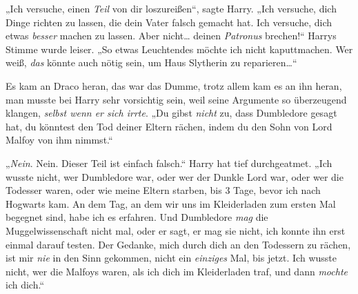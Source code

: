 „Ich versuche, einen \emph{Teil} von dir loszureißen“, sagte Harry. „Ich versuche, dich Dinge richten zu lassen, die dein Vater falsch gemacht hat. Ich versuche, dich etwas \emph{besser} machen zu lassen. Aber nicht… deinen \emph{Patronus} brechen!“ Harrys Stimme wurde leiser. „So etwas Leuchtendes möchte ich nicht kaputtmachen. Wer weiß, \emph{das} könnte auch nötig sein, um Haus Slytherin zu reparieren…“

Es kam an Draco heran, das war das Dumme, trotz allem kam es an ihn heran, man musste bei Harry sehr vorsichtig sein, weil seine Argumente so überzeugend klangen, \emph{selbst wenn er sich irrte}. „Du gibst \emph{nicht} zu, dass Dumbledore gesagt hat, du könntest den Tod deiner Eltern rächen, indem du den Sohn von Lord Malfoy von ihm nimmst.“

„\emph{Nein}. Nein. Dieser Teil ist einfach falsch.“ Harry hat tief durchgeatmet. „Ich wusste nicht, wer Dumbledore war, oder wer der Dunkle Lord war, oder wer die Todesser waren, oder wie meine Eltern starben, bis 3 Tage, bevor ich nach Hogwarts kam. An dem Tag, an dem wir uns im Kleiderladen zum ersten Mal begegnet sind, habe ich es erfahren. Und Dumbledore \emph{mag} die Muggelwissenschaft nicht mal, oder er sagt, er mag sie nicht, ich konnte ihn erst einmal darauf testen. Der Gedanke, mich durch dich an den Todessern zu rächen, ist mir \emph{nie} in den Sinn gekommen, nicht ein \emph{einziges} Mal, bis jetzt. Ich wusste nicht, wer die Malfoys waren, als ich dich im Kleiderladen traf, und dann \emph{mochte} ich dich.“

